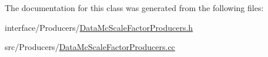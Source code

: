 The documentation for this class was generated from the following files:\begin{DoxyCompactItemize}
\item 
interface/Producers/\hyperlink{DataMcScaleFactorProducers_8h}{DataMcScaleFactorProducers.h}\item 
src/Producers/\hyperlink{DataMcScaleFactorProducers_8cc}{DataMcScaleFactorProducers.cc}\end{DoxyCompactItemize}
